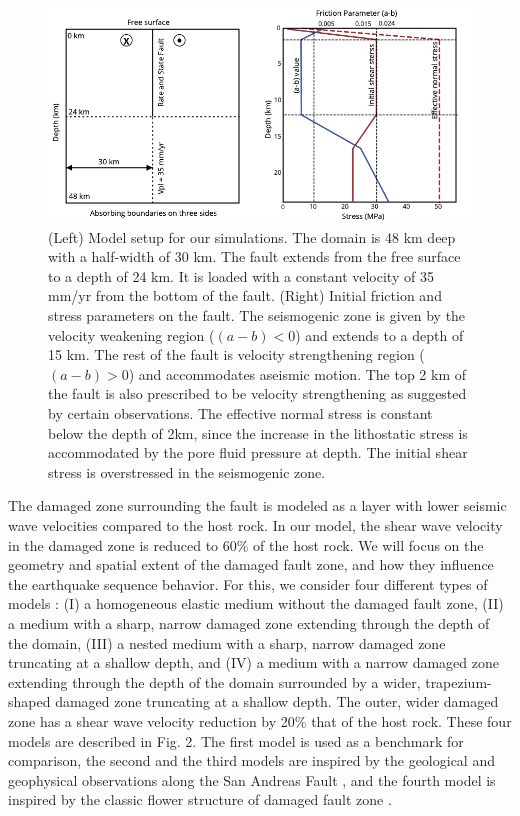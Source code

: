 \documentclass[11pt]{article}
\begin{document}
\begin{figure}[!htb]
    \centering
    \label{fig1}
    \includegraphics[scale=1]{1.png}
    \caption{(Left) Model setup for our simulations. The domain is 48 km deep with a half-width of 30 km. The fault extends from the free surface to a depth of 24 km. It is loaded with a constant velocity of 35 mm/yr from the bottom of the fault. (Right) Initial friction and stress parameters on the fault. The seismogenic zone is given by the velocity weakening region ($(a-b)<0$) and extends to a depth of 15 km. The rest of the fault is velocity strengthening region ($(a-b)>0$) and accommodates aseismic motion. The top 2 km of the fault is also prescribed to be velocity strengthening as suggested by certain observations. The effective normal stress is constant below the depth of 2km, since the increase in the lithostatic stress is accommodated by the pore fluid pressure at depth. The initial shear stress is overstressed in the seismogenic zone.}
\end{figure}

The damaged zone surrounding the fault is modeled as a layer with lower seismic wave velocities compared to the host rock. In our model, the shear wave velocity in the damaged zone is reduced to 60\% of the host rock. We will focus on the geometry and spatial extent of the damaged fault zone, and how they influence the earthquake sequence behavior. For this, we consider four different types of models : (I) a homogeneous elastic medium without the damaged fault zone, (II) a medium with a sharp, narrow damaged zone extending through the depth of the domain, (III) a nested medium with a sharp, narrow damaged zone truncating at a shallow depth, and (IV) a medium with a narrow damaged zone extending through the depth of the domain surrounded by a wider, trapezium-shaped damaged zone truncating at a shallow depth. The outer, wider damaged zone has a shear wave velocity reduction by 20\% that of the host rock. These four models are described in Fig. 2. The first model is used as a benchmark for comparison, the second and the third models are inspired by the geological and geophysical observations along the San Andreas Fault \citep{li_2006, lewis_2010}, and the fourth model is inspired by the classic flower structure of damaged fault zone \citep{sibson_1977, unsworth_1997, caine_1996, pelties_2015, perrin_2016}.
\end{document}
